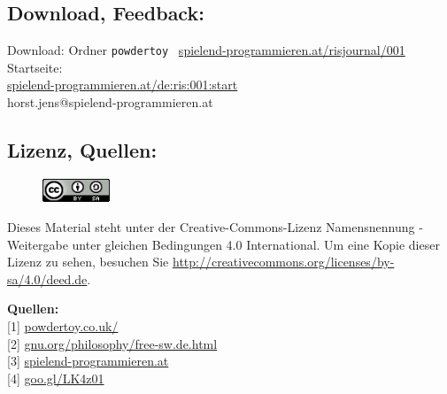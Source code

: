 \documentclass[10pt,a4paper,ngerman,twoside]{article} %
\newcommand{\SepRule}{\noindent	%
\begin{center}
\rule{250pt}{1pt} %
\end{center}
}
\begin{document}
\begin{multicols}{2}
\subsection*{Download, Feedback:}
\footnotesize{
Download: Ordner \texttt{powdertoy} \Mundus\ \href{http://spielend-programmieren.at/risjournal/001}{spielend-programmieren.at/risjournal/001}\\
Startseite:\\
\href{http://spielend-programmieren.at/de:ris:001:start}{spielend-programmieren.at/de:ris:001:start}\\ 
\Letter\:  horst.jens@spielend-programmieren.at \\}
\normalsize{}

\subsection*{Lizenz, Quellen:}
\begin{figure}
\includegraphics[width=2cm]{powdertoy/ccbysa88x31.png}
\end{figure}
Dieses Material steht unter der Creative-Commons-Lizenz Namensnennung - Weitergabe unter gleichen Bedingungen 4.0 International. Um eine Kopie dieser Lizenz zu sehen, besuchen Sie \url{http://creativecommons.org/licenses/by-sa/4.0/deed.de}.

\textbf{Quellen:} \\
{[}1{]} \href{http://powdertoy.co.uk/}{powdertoy.co.uk/} \\
{[}2{]} \href{http://www.gnu.org/philosophy/free-sw.de.html}{gnu.org/philosophy/free-sw.de.html} \\
{[}3{]} \href{http://spielend-programmieren.at}{spielend-programmieren.at} \\
{[}4{]} \href{http://goo.gl/LK4z01}{goo.gl/LK4z01} \\
\end{multicols}
\end{document}
